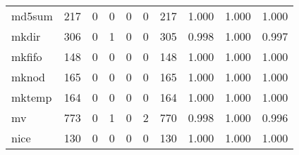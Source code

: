 \begin{longtable}{lp{2.0cm}p{2.0cm}p{2.0cm}p{2.0cm}p{2.0cm}p{2.0cm}p{2.0cm}p{2.0cm}p{2.0cm}}
md5sum    &                    217 &                                  0 &                                 0 &                                0 &                                 0 &                             217 &                                   1.000 &                                  1.000 &                                1.000 \\
mkdir     &                    306 &                                  0 &                                 1 &                                0 &                                 0 &                             305 &                                   0.998 &                                  1.000 &                                0.997 \\
mkfifo    &                    148 &                                  0 &                                 0 &                                0 &                                 0 &                             148 &                                   1.000 &                                  1.000 &                                1.000 \\
mknod     &                    165 &                                  0 &                                 0 &                                0 &                                 0 &                             165 &                                   1.000 &                                  1.000 &                                1.000 \\
mktemp    &                    164 &                                  0 &                                 0 &                                0 &                                 0 &                             164 &                                   1.000 &                                  1.000 &                                1.000 \\
mv        &                    773 &                                  0 &                                 1 &                                0 &                                 2 &                             770 &                                   0.998 &                                  1.000 &                                0.996 \\
nice      &                    130 &                                  0 &                                 0 &                                0 &                                 0 &                             130 &                                   1.000 &                                  1.000 &                                1.000 \\

\end{longtable}
